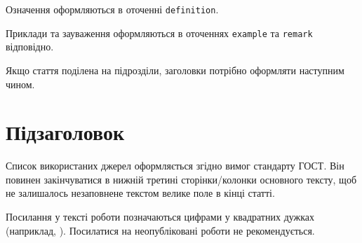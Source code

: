 \documentclass{KnuBulletin}
\begin{document}
\begin{multicols}{2}
    \begin{definition}
	   	Означення оформляються в оточенні \texttt{definition}.
	\end{definition}	
    

	\begin{remark}
		Приклади та зауваження оформляються в оточеннях 
		\texttt{example} та \texttt{remark} відповідно.
	\end{remark}
	
	Якщо стаття поділена на підрозділи, заголовки потрібно оформляти наступним чином. 
	\section*{Підзаголовок}

	Список використаних джерел оформляється згідно вимог стандарту ГОСТ. 
	Він повинен закінчуватися в нижній третині сторінки/колонки основного тексту, щоб не залишалось незаповнене текстом велике поле в кінці статті. 
	
	Посилання у тексті роботи позначаються цифрами у квадратних дужках (наприклад, \cite{takacs1962}). 
	Посилатися на неопубліковані роботи не рекомендується. 


    
    
    

\end{multicols}
\end{document}
